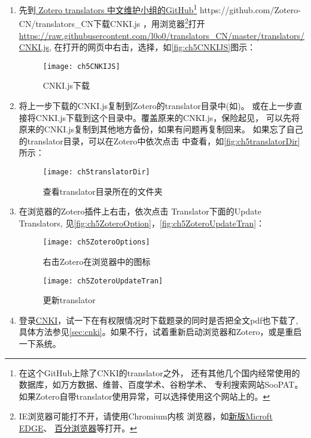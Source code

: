 \documentclass[cn,11pt,chinese]{elegantbook}
\begin{document}
			\begin{enumerate}
				\item\label{it:cnkijs}
					先到\href{https://github.com/Zotero-CN/translators_CN}{ Zotero translators 
					中文维护小组的GitHub\footnote{在这个GitHub上除了CNKI的translator之外，
					还有其他几个国内经常使用的数据库，如万方数据、维普、百度学术、谷粉学术、
					专利搜索网站SooPAT。如果Zotero自带translator使用异常，可以选择使用这个网站上的。} 
					\url{ https://github.com/Zotero-CN/translators_CN}}下载CNKI.js
					，用浏览器\footnote{IE浏览器可能打不开，请使用Chromium内核
					浏览器，如\href{https://www.microsoft.com/zh-cn/edge}{新版Microft EDGE}、
					\href{http://www.centbrowser.cn/history.html}{百分浏览器}等打开。}打开
					\url{https://raw.githubusercontent.com/l0o0/translators_CN/master/translators/CNKI.js},
					在打开的网页中右击，选择，如\autoref{fig:ch5CNKIJS}图示：
					\begin{figure}[htbp]
						\centering
						\texttt{[image: ch5CNKIJS]}
						\caption{CNKI.js下载}
						\label{fig:ch5CNKIJS}
					\end{figure}
				\item
				  将上一步下载的CNKI.js复制到Zotero的translator目录中(如)。
				  或在上一步直接将CNKI.js下载到这个目录中。覆盖原来的CNKI.js，保险起见，
				  可以先将原来的CNKI.js复制到其他地方备份，如果有问题再复制回来。
				  如果忘了自己的translator目录，可以在Zotero中依次点击
				  中查看，如\autoref{fig:ch5translatorDir}所示：
					  \begin{figure}[htbp]
					  	\centering
					  	\texttt{[image: ch5translatorDir]}
					  	\caption{查看translator目录所在的文件夹}
					  	\label{fig:ch5translatorDir}
					  \end{figure}
				  \item
				  在浏览器的Zotero插件上右击，依次点击 Translator下面的Update Translators,
				  见\autoref{fig:ch5ZoteroOption}，\autoref{fig:ch5ZoteroUpdateTran}：
				  \begin{figure}[htbp]
				  	\centering
				  	\texttt{[image: ch5ZoteroOptions]}
				  	\caption{右击Zotero在浏览器中的图标}
				  	\label{fig:ch5ZoteroOption}
				  \end{figure}
			     \begin{figure}[htbp]
			  	  \centering
			  	  \texttt{[image: ch5ZoteroUpdateTran]}
			  	  \caption{更新translator}
			  	  \label{fig:ch5ZoteroUpdateTran}
			     \end{figure}
				\item
				登录\href{http://www.cnki.net}{CNKI}，试一下在有权限情况时下载题录的同时是否把全文pdf也下载了,
				具体方法参见\cref{sec:cnki}。如果不行，试着重新启动浏览器和Zotero，或是重启一下系统。
				\end{enumerate}
			
\end{document}
